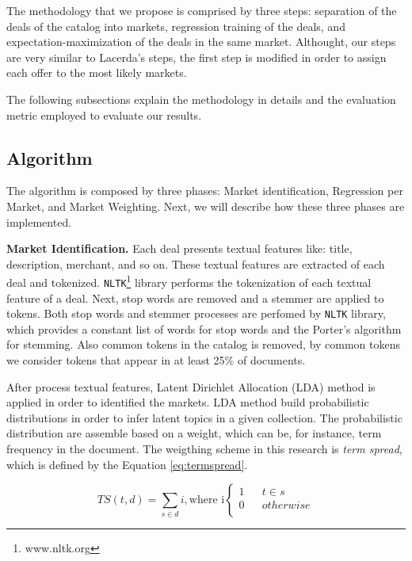\documentclass{acm_proc_article-sp}
\begin{document}
The methodology that we propose is comprised by three steps: 
separation of the deals of the catalog into markets, regression training 
of the deals, and expectation-maximization of the deals in the same 
market. Althought, our steps are very similar to Lacerda's steps, 
the first step is modified in order to assign each offer to the 
most likely markets.

The following subsections explain the methodology in details and 
the evaluation metric employed to evaluate our results.

\subsection{Algorithm}

The algorithm is composed by three phases: Market identification, 
Regression per Market, and Market Weighting. Next, we will 
describe how these three phases are implemented.

\textbf{Market Identification.} Each deal presents textual features 
like: title, description, 
merchant, and so on. These textual features are extracted 
of each deal and tokenized. \texttt{NLTK}\footnote{www.nltk.org} library 
performs the tokenization of each textual feature of a deal. 
Next, stop words are removed and a stemmer are applied to tokens. 
Both stop words and stemmer processes are perfomed by 
\texttt{NLTK} library, which provides a constant list of words 
for stop words and the Porter's algorithm for stemming.
Also common tokens in the catalog is removed, by common tokens 
we consider tokens that appear in at least 25\%  of documents.

After process textual features,
Latent Dirichlet Allocation (LDA) 
method is applied in order to identified the markets. LDA method 
build probabilistic distributions in order to infer latent topics 
in a given collection. The probabilistic distribution are assemble 
based on a weight, which can be, for instance, term frequency in 
the document. The weigthing scheme in this research is 
\emph{term spread}, which is defined by the Equation 
\ref{eq:termspread}.

\begin{equation}
    TS(t,d) = \sum_{s \in d} i, \text{where i} \left\{ \begin{aligned} 
    1 & & t \in s \\
    0 & & otherwise \\
    \end{aligned} \right.
    \label{eq:termspread}
\end{equation}
\end{document}

